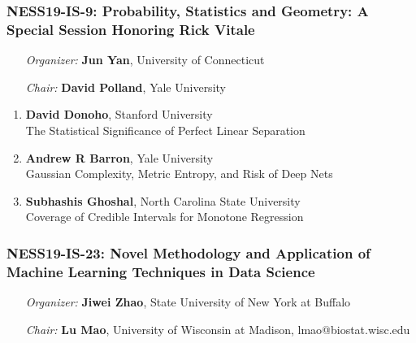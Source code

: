 \subsubsection*{NESS19-IS-9: Probability, Statistics and Geometry: A Special Session Honoring Rick Vitale}

\begin{enumerate}[align=left]
\item [\emph{Organizer:}] \textbf{Jun Yan}, University of Connecticut
\item [\emph{Chair:}] \textbf{David Polland},  Yale University
\end{enumerate}

\begin{enumerate}
\item \textbf{David Donoho}, Stanford University \\
The Statistical Significance of Perfect Linear Separation
\item \textbf{Andrew R Barron}, Yale University \\
Gaussian Complexity, Metric Entropy, and Risk of Deep Nets
\item \textbf{Subhashis Ghoshal}, North Carolina State University \\
Coverage of Credible Intervals for Monotone Regression
\end{enumerate}

\subsubsection*{NESS19-IS-23: Novel Methodology and Application of Machine Learning Techniques in Data Science}

\begin{enumerate}[align=left]
\item [\emph{Organizer:}] \textbf{Jiwei Zhao}, State University of New York at Buffalo
\item [\emph{Chair:}] \textbf{Lu Mao},  University of Wisconsin at Madison, lmao@biostat.wisc.edu
\end{enumerate}

